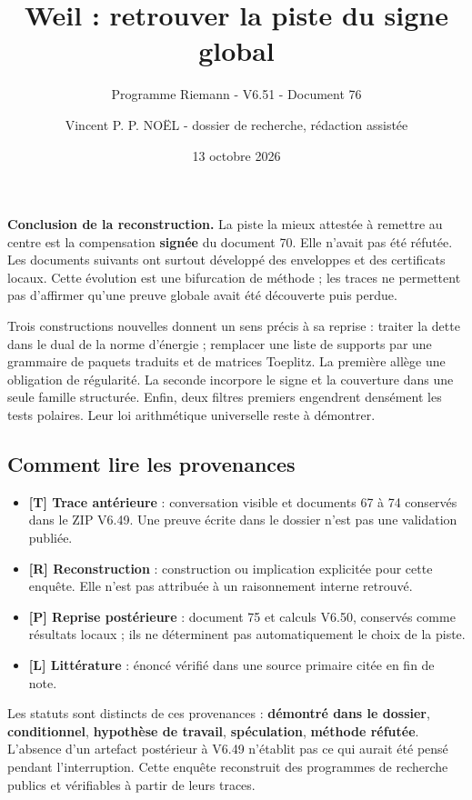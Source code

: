 \documentclass[
  10pt,
  a4paper,
]{article}
\title{Weil : retrouver la piste du signe global}
\subtitle{Programme Riemann - V6.51 - Document 76}
\author{Vincent P. P. NOËL - dossier de recherche, rédaction assistée}
\date{13 octobre 2026}
\providecommand{\tightlist}{%
  \setlength{\itemsep}{0pt}\setlength{\parskip}{0pt}}
\begin{document}
\maketitle

{
\setcounter{tocdepth}{2}
\tableofcontents
}
\textbf{Conclusion de la reconstruction.} La piste la mieux attestée à
remettre au centre est la compensation \textbf{signée} du document 70.
Elle n'avait pas été réfutée. Les documents suivants ont surtout
développé des enveloppes et des certificats locaux. Cette évolution est
une bifurcation de méthode ; les traces ne permettent pas d'affirmer
qu'une preuve globale avait été découverte puis perdue.

Trois constructions nouvelles donnent un sens précis à sa reprise :
traiter la dette dans le dual de la norme d'énergie ; remplacer une
liste de supports par une grammaire de paquets traduits et de matrices
Toeplitz. La première allège une obligation de régularité. La seconde
incorpore le signe et la couverture dans une seule famille structurée.
Enfin, deux filtres premiers engendrent densément les tests polaires.
Leur loi arithmétique universelle reste à démontrer.

\hypertarget{comment-lire-les-provenances}{%
\subsection{Comment lire les
provenances}\label{comment-lire-les-provenances}}

\begin{itemize}
\tightlist
\item
  \textbf{{[}T{]} Trace antérieure} : conversation visible et documents
  67 à 74 conservés dans le ZIP V6.49. Une preuve écrite dans le dossier
  n'est pas une validation publiée.
\item
  \textbf{{[}R{]} Reconstruction} : construction ou implication
  explicitée pour cette enquête. Elle n'est pas attribuée à un
  raisonnement interne retrouvé.
\item
  \textbf{{[}P{]} Reprise postérieure} : document 75 et calculs V6.50,
  conservés comme résultats locaux ; ils ne déterminent pas
  automatiquement le choix de la piste.
\item
  \textbf{{[}L{]} Littérature} : énoncé vérifié dans une source primaire
  citée en fin de note.
\end{itemize}

Les statuts sont distincts de ces provenances : \textbf{démontré dans le
dossier}, \textbf{conditionnel}, \textbf{hypothèse de travail},
\textbf{spéculation}, \textbf{méthode réfutée}. L'absence d'un artefact
postérieur à V6.49 n'établit pas ce qui aurait été pensé pendant
l'interruption. Cette enquête reconstruit des programmes de recherche
publics et vérifiables à partir de leurs traces.
\end{document}
